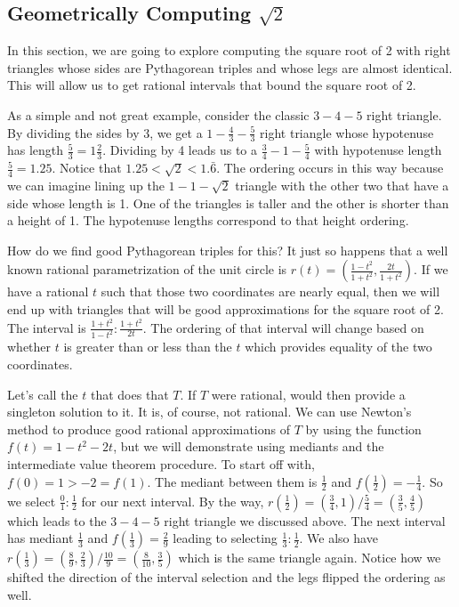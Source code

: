 \documentclass[12pt]{article}
\begin{document}
\subsection{Geometrically Computing $\sqrt{2}$}

In this section, we are going to explore computing the square root of 2 with right triangles whose sides are Pythagorean triples and whose legs are almost identical. This will allow us to get rational intervals that bound the square root of 2. 

As a simple and not great example, consider the classic $3-4-5$ right triangle. By dividing the sides by 3, we get a $1-\frac{4}{3}-\frac{5}{3}$ right triangle whose hypotenuse has length $\frac{5}{3} = 1 \frac{2}{3}$. Dividing by 4 leads us to a $\frac{3}{4}-1-\frac{5}{4}$ with hypotenuse  length $\frac{5}{4} = 1.25$. Notice that $1.25 < \sqrt{2} < 1.\bar{6}$.  The ordering occurs in this way because we can imagine lining up the $1-1-\sqrt{2}$ triangle with the other two that have a side whose length is 1. One of the triangles is taller and the other is shorter than a height of 1. The hypotenuse lengths correspond to that height ordering. 

How do we find good Pythagorean triples for this? It just so happens that a well known rational parametrization of the unit circle is  $r(t) = (\frac{1-t^2}{1+t^2}, \frac{2t}{1+t^2})$.  If we have a rational $t$ such that those two coordinates are nearly equal, then we will end up with triangles that will be good approximations for the square root of 2. The interval is $\frac{1+t^2}{1-t^2}:\frac{1+t^2}{2t}$. The ordering of that interval will change based on whether $t$ is greater than or less than the $t$ which provides equality of the two coordinates. 

Let's call the $t$ that does that $T$. If $T$ were rational, would then provide a singleton solution to it. It is, of course, not rational. We can use Newton's method to produce good rational approximations of $T$ by using the function $f(t) = 1-t^2 - 2t$, but we will demonstrate using mediants and the intermediate value theorem procedure. To start off with, $f(0) = 1 > -2 = f(1)$. The mediant between them is $\frac{1}{2}$ and $f(\frac{1}{2}) = -\frac{1}{4}$. So we select $\frac{0}{1}:\frac{1}{2}$ for our next interval. By the way, $r(\frac{1}{2}) = (\frac{3}{4}, 1) / \frac{5}{4} = (\frac{3}{5}, \frac{4}{5})$ which leads to the $3-4-5$ right triangle we discussed above.  The next interval has mediant $\frac{1}{3}$ and $f(\frac{1}{3}) = \frac{2}{9}$ leading to selecting $\frac{1}{3}:\frac{1}{2}$. We also have $r(\frac{1}{3}) = ( \frac{8}{9}, \frac{2}{3}) / \frac{10}{9} = (\frac{8}{10}, \frac{3}{5})$ which is the same triangle again. Notice how we shifted the direction of the interval selection and the legs flipped the ordering as well.
\end{document}
